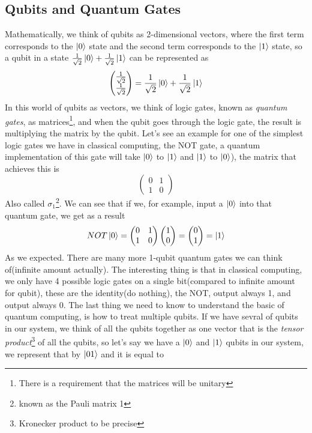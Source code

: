 \documentclass[english, a4paper, 12pt, twoside]{article}
\numberwithin{equation}{section} %
\begin{document}
\subsection{Qubits and Quantum Gates}
Mathematically, we think of qubits as 2-dimensional vectors, where the first term corresponds to the $\ket{0}$ state and the second term corresponds to the $\ket{1}$ state, so a qubit in a state $\frac{1}{\sqrt{2}} \ket{0} + \frac{1}{\sqrt{2}} \ket{1}$ can be represented as
\[
\begin{pmatrix}
    \frac{1}{\sqrt{2}} \\
    \frac{1}{\sqrt{2}} 
\end{pmatrix} = \frac{1}{\sqrt{2}} \ket{0} + \frac{1}{\sqrt{2}} \ket{1}
\]
In this world of qubits as vectors, we think of logic gates, known as \textit{quantum gates}, as matrices\footnote{There is a requirement that the matrices will be unitary}, and when the qubit goes through the logic gate, the result is multiplying the matrix by the qubit. Let's see an example for one of the simplest logic gates we have in classical computing, the NOT gate, a quantum implementation of this gate will take $\ket{0}$ to $\ket{1}$ and $\ket{1}$ to $\ket{0}$), the matrix that achieves this is 
\[
\begin{pmatrix}
    0 & 1 \\
    1 & 0
\end{pmatrix}
\]
Also called $\sigma_1$\footnote{known as the Pauli matrix 1}. We can see that if we, for example, input a $\ket{0}$ into that quantum gate, we get as a result
\[
NOT \ket{0} = 
\begin{pmatrix}
    0 & 1 \\
    1 & 0
\end{pmatrix}
\begin{pmatrix}
    1 \\
    0
\end{pmatrix} = 
\begin{pmatrix}
    0 \\
    1
\end{pmatrix} = \ket{1}
\]
As we expected. There are many more 1-qubit quantum gates we can think of(infinite amount actually). The interesting thing is that in classical computing, we only have 4 possible logic gates on a single bit(compared to infinite amount for qubit), these are the identity(do nothing), the NOT, output always 1, and output always 0. %
The last thing we need to know to understand the basic of quantum computing, is how to treat multiple qubits. If we have sevral of qubits in our system, we think of all the qubits together as one vector that is the \textit{tensor product}\footnote{Kronecker product to be precise} of all the qubits, so let's say we have a $\ket{0}$ and $\ket{1}$ qubits in our system, we represent that by $\ket{01}$ and it is equal to
\end{document}
